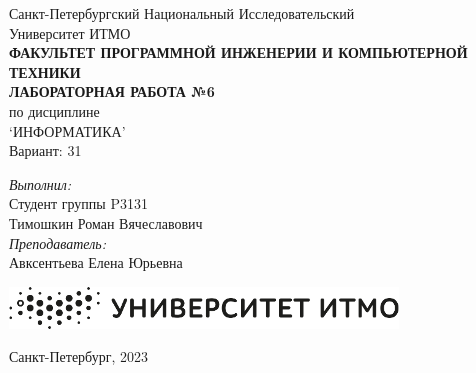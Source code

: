\documentclass[Main.tex]{subfiles}
\begin{document}
\begin{center}
Санкт-Петербургский Национальный Исследовательский\\
Университет ИТМО\\
\hfill \break
\textbf{ФАКУЛЬТЕТ ПРОГРАММНОЙ ИНЖЕНЕРИИ И КОМПЬЮТЕРНОЙ ТЕХНИКИ}\\
\vspace{2.5cm}
\large{\textbf{ЛАБОРАТОРНАЯ РАБОТА №6}}\\
по дисциплине\\
\large{`ИНФОРМАТИКА'}\\
\hfill \break
Вариант: 31\\
\end{center}

\vspace{8cm}
 
\begin{flushright}
\textit{Выполнил:}\\
Студент группы P3131\\
Тимошкин Роман Вячеславович\\
\textit{Преподаватель:}\\
Авксентьева Елена Юрьевна\\
\end{flushright}
 
\vfill

\begin{center}
\includegraphics[scale=0.5]{../images/ITMO}
\end{center}
\begin{center} Санкт-Петербург, 2023 \end{center}

\thispagestyle{empty}
\newpage
\end{document}

